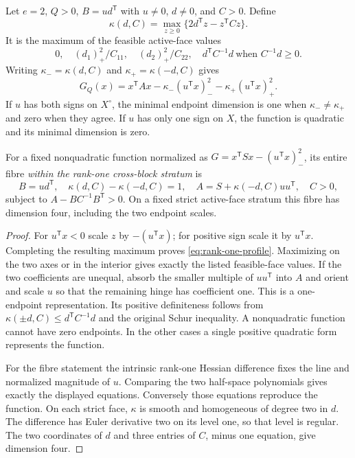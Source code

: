 \begin{proposition}\label{prop:rank-one-stratum}
Let $e=2$, $Q>0$, $B=u d^{\mathsf T}$ with $u\ne0$, $d\ne0$, and $C>0$. Define
\[
 \kappa(d,C)=\max_{z\ge0}\{2d^{\mathsf T}z-z^{\mathsf T}Cz\}.
\]
It is the maximum of the feasible active-face values
\[
 0,\quad (d_1)_+^2/C_{11},\quad(d_2)_+^2/C_{22},\quad
 d^{\mathsf T}C^{-1}d\ \text{when }C^{-1}d\ge0.
\]
Writing $\kappa_- =\kappa(d,C)$ and $\kappa_+=\kappa(-d,C)$ gives
\begin{equation}\label{eq:rank-one-profile}
 G_Q(x)=x^{\mathsf T}Ax-\kappa_-(u^{\mathsf T}x)_-^2
                         -\kappa_+(u^{\mathsf T}x)_+^2.
\end{equation}
If $u$ has both signs on $X^\circ$, the minimal endpoint dimension is one
when $\kappa_-\ne\kappa_+$ and zero when they agree. If $u$ has only one
sign on $X$, the function is quadratic and its minimal dimension is zero.

For a fixed nonquadratic function normalized as
$G=x^{\mathsf T}Sx-(u^{\mathsf T}x)_-^2$, its entire fibre \emph{within
the rank-one cross-block stratum} is
\[
 B=u d^{\mathsf T},\quad \kappa(d,C)-\kappa(-d,C)=1,\quad
 A=S+\kappa(-d,C)uu^{\mathsf T},\quad C>0,
\]
subject to $A-BC^{-1}B^{\mathsf T}>0$. On a fixed strict active-face
stratum this fibre has dimension four, including the two endpoint scales.
\end{proposition}
\begin{proof}
For $u^{\mathsf T}x<0$ scale $z$ by $-(u^{\mathsf T}x)$; for positive
sign scale it by $u^{\mathsf T}x$. Completing the resulting maximum proves
\eqref{eq:rank-one-profile}. Maximizing on the two axes or in the interior
gives exactly the listed feasible-face values. If the two coefficients
are unequal, absorb the smaller multiple of $uu^{\mathsf T}$ into $A$
and orient and scale $u$ so that the remaining hinge has coefficient one.
This is a one-endpoint representation. Its positive definiteness follows
from $\kappa(\pm d,C)\le d^{\mathsf T}C^{-1}d$ and the original Schur
inequality. A nonquadratic function cannot have zero endpoints. In the
other cases a single positive quadratic form represents the function.

For the fibre statement the intrinsic rank-one Hessian difference fixes
the line and normalized magnitude of $u$. Comparing the two half-space
polynomials gives exactly the displayed equations. Conversely those
equations reproduce the function. On each strict face, $\kappa$ is smooth
and homogeneous of degree two in $d$. The difference has Euler derivative
two on its level one, so that level is regular. The two coordinates of
$d$ and three entries of $C$, minus one equation, give dimension four.
\end{proof}

